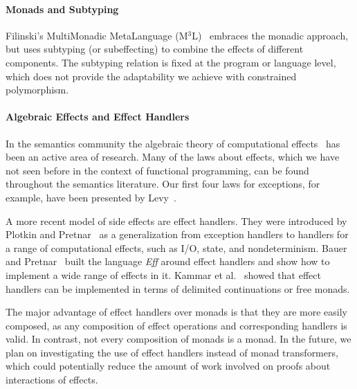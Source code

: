 \paragraph{Monads and Subtyping}
Filinski's MultiMonadic
MetaLanguage (M$^3$L)~\cite{Filinski:MonadicSemantics,Filinski:MonadsInAction}
embraces the monadic approach, but uses subtyping (or subeffecting) to
combine the effects of different components. The subtyping relation is fixed at
the program or language level, which does not provide the adaptability we
achieve with constrained polymorphism.

\paragraph{Algebraic Effects and Effect Handlers} In the semantics
community the algebraic theory of computational
effects~\cite{plotkin02notions} has been an active area of
research. Many of the laws about effects, which we have not seen
before in the context of functional programming, can be found
throughout the semantics literature. Our first four laws for
exceptions, for example, have been presented by
Levy~\cite{levy06monads}.

A more recent model of side effects are effect handlers. They were introduced by
Plotkin and Pretnar~\cite{handlers} as a generalization from exception
handlers to handlers for a range of computational effects, such as
I/O, state, and nondeterminism. Bauer and Pretnar~\cite{eff} built the
language \emph{Eff} around effect handlers and show how to implement a
wide range of effects in it.  Kammar et al.~\cite{hia} showed that
effect handlers can be implemented in terms of delimited continuations
or free monads.

The major advantage of effect handlers over monads is that they are
more easily composed, as any composition of effect operations and
corresponding handlers is valid. In contrast, not every composition of
monads is a monad. In the future, we plan on investigating the use of
effect handlers instead of monad transformers, which could potentially
reduce the amount of work involved on proofs about interactions of
effects.



